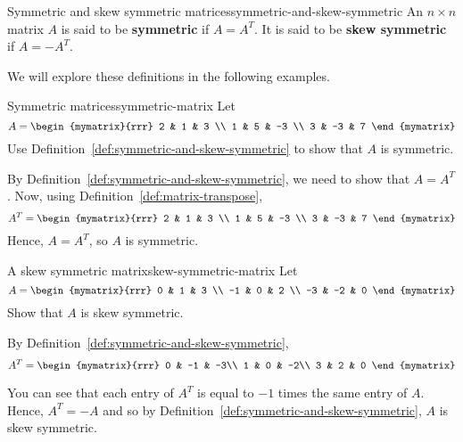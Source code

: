 \begin{definition}{Symmetric and skew symmetric
    matrices}{symmetric-and-skew-symmetric}
  An $n\times n$ matrix $A$ is said to be
  \textbf{symmetric} if $A=A^{T}.$ It is said
  to be \textbf{skew symmetric} if
  $A=-A^{T}.$
\end{definition}

We will explore these definitions in the following examples.

\begin{example}{Symmetric matrices}{symmetric-matrix}
  Let
  \begin{equation*}
    A=\begin{mymatrix}{rrr}
      2 & 1 & 3 \\
      1 & 5 & -3 \\
      3 & -3 & 7
    \end{mymatrix} 
  \end{equation*}
  Use Definition~\ref{def:symmetric-and-skew-symmetric} to show that
  $A$ is symmetric.
\end{example}

\begin{solution}
  By Definition~\ref{def:symmetric-and-skew-symmetric}, we need to
  show that $A = A^T$.  Now, using Definition~\ref{def:matrix-transpose},
  \begin{equation*}
    A^{T} = \begin{mymatrix}{rrr}
      2 & 1 & 3 \\
      1 & 5 & -3 \\
      3 & -3 & 7
    \end{mymatrix}
  \end{equation*}
  Hence, $A = A^{T}$, so $A$ is symmetric.
\end{solution}

\begin{example}{A skew symmetric matrix}{skew-symmetric-matrix}
  Let
  \begin{equation*}
    A=\begin{mymatrix}{rrr}
      0 & 1 & 3 \\
      -1 & 0 & 2 \\
      -3 & -2 & 0
    \end{mymatrix} 
  \end{equation*}
  Show that $A$ is skew symmetric.
\end{example}

\begin{solution} By Definition~\ref{def:symmetric-and-skew-symmetric}, 
  \begin{equation*}
    A^{T} = \begin{mymatrix}{rrr}
      0 & -1 & -3\\
      1 &  0 & -2\\
      3 &  2 &  0
    \end{mymatrix} 
  \end{equation*}

  You can see that each entry of $A^T$ is equal to $-1$ times the same
  entry of $A$.  Hence, $A^{T} = - A$ and so by
  Definition~\ref{def:symmetric-and-skew-symmetric}, $A$ is skew
  symmetric.
\end{solution}
